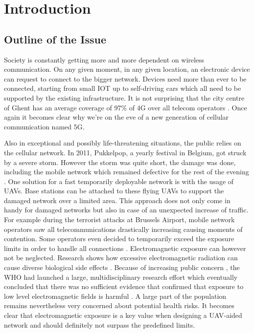 \chapter{Introduction}
\label{chap:intro}

\section{Outline of the Issue} %
\label{sec:issue}

Society is constantly getting more and more dependent on wireless communication. 
On any given moment, in any given location, an electronic device
can request to connect to the bigger network. Devices need more than ever to be connected, 
starting from small \gls{IOT} up to self-driving cars
which all need to be supported by the existing infrastructure. 
It is not surprising that the city centre of Ghent has an average coverage of 97\% of 4G over all telecom operators
\cite{testaankoop}. Once again it becomes clear why we're on the eve of a new generation of cellular communication named 5G. 

Also in exceptional and possibly life-threatening situations, the public relies on the cellular network. 
In 2011, Pukkelpop, a yearly festival in Belgium, got struck by a severe storm. However the storm 
was quite short, the damage was done, including the mobile network which remained defective for the rest of the evening \cite{pukkelpop}.
One solution for a fast temporarily deployable network is with the usage of \gls{UAV}s. Base stations can be attached to 
these flying \gls{UAV}s to support the damaged network over a limited area. 
This approach does not only come in handy for 
damaged networks but also in case of an unexpected increase of traffic. 
For example during the terrorist attacks at Brussels Airport,
mobile network operators saw all telecommunications drastically increasing causing moments of contention. 
Some operators even decided to temporarily exceed the exposure limits in
order to handle all connections \cite{baseZaventem}.
Electromagnetic exposure can however not be neglected. Research shows how excessive electromagnetic radiation can cause diverse biological side effects \cite{J31_bioeffects}.
Because of increasing public concern \cite{J31_bioeffects}, the \gls{WHO} had launched a large, multidisciplinary research effort which eventually concluded that there was no sufficient evidence that confirmed 
that exposure to low level electromagnetic fields is harmful \cite{WHO}. 
A large part of the population remains nevertheless very concerned about potential health risks.
It becomes clear that electromagnetic exposure is a key value when designing a \gls{UAV}-aided network and should definitely 
not surpass the predefined limits.

